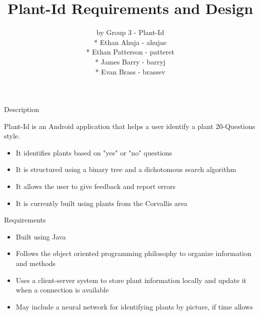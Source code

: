 \documentclass{beamer}
\title{Plant-Id Requirements and Design}
\author{by Group 3 - Plant-Id \\* Ethan Ahuja - ahujae \\* Ethan Patterson - patteret \\* James Barry - barryj \\* Evan Brass - brassev}
\begin{document}
\begin{frame}
\maketitle
\end{frame}


\begin{frame}{Description}

Plant-Id is an Android application that helps a user identify a plant 20-Questions style. 

\begin{itemize}
\item It identifies plants based on "yes" or "no" questions
\item It is structured using a binary tree and a dichotomous search algorithm
\item It allows the user to give feedback and report errors
\item It is currently built using plants from the Corvallis area
\end{itemize}

\end{frame}

\begin{frame}{Requirements}
\begin{itemize}
\item Built using Java
\item Follows the object oriented programming philosophy to organize information and methods
\item Uses a client-server system to store plant information locally and update it when a connection is available
\item May include a neural network for identifying plants by picture, if time allows
\end{itemize}
\end{frame}
\end{document}
